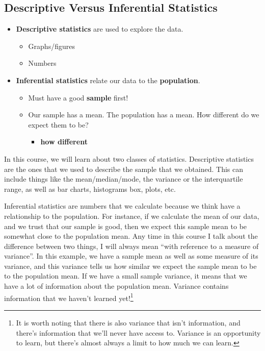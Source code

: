 \documentclass[
  letterpaper,
  DIV=11,
  numbers=noendperiod]{scrreprt}
\providecommand{\tightlist}{%
  \setlength{\itemsep}{0pt}\setlength{\parskip}{0pt}}\usepackage{longtable,booktabs,array}
\begin{document}
\hypertarget{descriptive-versus-inferential-statistics}{%
\subsection{Descriptive Versus Inferential
Statistics}\label{descriptive-versus-inferential-statistics}}

\begin{itemize}
\tightlist
\item
  \textbf{Descriptive statistics} are used to explore the data.

  \begin{itemize}
  \tightlist
  \item
    Graphs/figures
  \item
    Numbers
  \end{itemize}
\item
  \textbf{Inferential statistics} relate our data to the
  \textbf{population}.

  \begin{itemize}
  \tightlist
  \item
    Must have a good \textbf{sample} first!
  \item
    Our sample has a mean. The population has a mean. How different do
    we expect them to be?

    \begin{itemize}
    \tightlist
    \item
      \textbf{how different}
    \end{itemize}
  \end{itemize}
\end{itemize}

In this course, we will learn about two classes of statistics.
Descriptive statistics are the ones that we used to describe the sample
that we obtained. This can include things like the mean/median/mode, the
variance or the interquartile range, as well as bar charts, histograms
box, plots, etc.

Inferential statistics are numbers that we calculate because we think
have a relationship to the population. For instance, if we calculate the
mean of our data, and we trust that our sample is good, then we expect
this sample mean to be somewhat close to the population mean. Any time
in this course I talk about the difference between two things, I will
always mean ``with reference to a measure of variance''. In this
example, we have a sample mean as well as some measure of its variance,
and this variance tells us how similar we expect the sample mean to be
to the population mean. If we have a small sample variance, it means
that we have a lot of information about the population mean. Variance
contains information that we haven't learned yet!\footnote{It is worth
  noting that there is also variance that isn't information, and there's
  information that we'll never have access to. Variance is an
  opportunity to learn, but there's almost always a limit to how much we
  can learn.}
\end{document}
